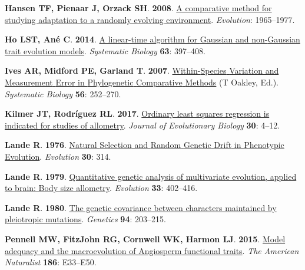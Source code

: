 \documentclass[
  letterpaper,
  DIV=11,
  numbers=noendperiod]{scrartcl}
\newlength{\cslhangindent}
\newenvironment{CSLReferences}[2] %
 {\begin{list}{}{%
  \setlength{\itemindent}{0pt}
  \setlength{\leftmargin}{0pt}
  \setlength{\parsep}{0pt}
  \ifodd #1
   \setlength{\leftmargin}{\cslhangindent}
   \setlength{\itemindent}{-1\cslhangindent}
  \fi
  \setlength{\itemsep}{#2\baselineskip}}}
 {\end{list}}
\begin{document}
\begin{CSLReferences}{0}{1}
\textbf{\textbf{Hansen TF}, \textbf{Pienaar J}, \textbf{Orzack SH}}.
\textbf{2008}. \href{https://doi.org/10.1111/j.1558-5646.2008.00412.x}{A
comparative method for studying adaptation to a randomly evolving
environment}. \emph{Evolution}: 1965--1977.

\textbf{\textbf{Ho LST}, \textbf{Ané C}}. \textbf{2014}.
\href{https://doi.org/10.1093/sysbio/syu005}{A linear-time algorithm for
{Gaussian} and non-{Gaussian} trait evolution models}. \emph{Systematic
Biology} \textbf{63}: 397--408.

\textbf{\textbf{Ives AR}, \textbf{Midford PE}, \textbf{Garland T}}.
\textbf{2007}.
\href{https://doi.org/10.1080/10635150701313830}{Within-{Species}
{Variation} and {Measurement} {Error} in {Phylogenetic} {Comparative}
{Methods}} (T Oakley, Ed.). \emph{Systematic Biology} \textbf{56}:
252--270.

\textbf{\textbf{Kilmer JT}, \textbf{Rodríguez RL}}. \textbf{2017}.
\href{https://doi.org/10.1111/jeb.12986}{Ordinary least squares
regression is indicated for studies of allometry}. \emph{Journal of
Evolutionary Biology} \textbf{30}: 4--12.

\textbf{\textbf{Lande R}}. \textbf{1976}.
\href{https://doi.org/10.2307/2407703}{Natural {Selection} and {Random}
{Genetic} {Drift} in {Phenotypic} {Evolution}}. \emph{Evolution}
\textbf{30}: 314.

\textbf{\textbf{Lande R}}. \textbf{1979}.
\href{https://doi.org/10.2307/2407630}{Quantitative genetic analysis of
multivariate evolution, applied to brain: Body size allometry}.
\emph{Evolution} \textbf{33}: 402--416.

\textbf{\textbf{Lande R}}. \textbf{1980}.
\href{https://doi.org/10.1093/genetics/94.1.203}{The genetic covariance
between characters maintained by pleiotropic mutations}. \emph{Genetics}
\textbf{94}: 203--215.

\textbf{\textbf{Pennell MW}, \textbf{FitzJohn RG}, \textbf{Cornwell WK},
\textbf{Harmon LJ}}. \textbf{2015}.
\href{https://doi.org/10.1086/682022}{Model adequacy and the
macroevolution of {Angiosperm} functional traits}. \emph{The American
Naturalist} \textbf{186}: E33--E50.


\end{CSLReferences}
\end{document}
